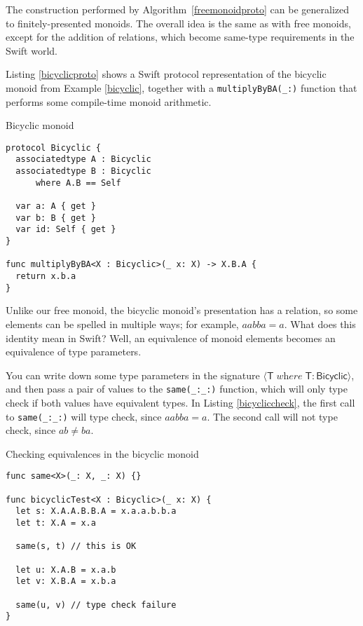 \documentclass[headsepline,bibliography=totoc]{scrreport}
\newcommand{\genericparam}[1]{\bm{\mathsf{#1}}}
\newcommand{\proto}[1]{\bm{\mathsf{#1}}}
\newcommand{\gensig}[2]{\langle #1\;\textit{where}\;#2\rangle}
\theoremstyle{definition}
\theoremstyle{definition}
\theoremstyle{definition}
\begin{document}
The construction performed by Algorithm~\ref{freemonoidproto} can be generalized to finitely-presented monoids. The overall idea is the same as with free monoids, except for the addition of relations, which become same-type requirements in the Swift world.

Listing \ref{bicyclicproto} shows a Swift protocol representation of the bicyclic monoid from Example \ref{bicyclic}, together with a \texttt{multiplyByBA(\_:)} function that performs some compile-time monoid arithmetic.

\begin{listing}\caption{Bicyclic monoid}\label{bicyclicproto}
\begin{Verbatim}
protocol Bicyclic {
  associatedtype A : Bicyclic
  associatedtype B : Bicyclic
      where A.B == Self
  
  var a: A { get }
  var b: B { get }
  var id: Self { get }
}

func multiplyByBA<X : Bicyclic>(_ x: X) -> X.B.A {
  return x.b.a
}
\end{Verbatim}
\end{listing}
Unlike our free monoid, the bicyclic monoid's presentation has a relation, so some elements can be spelled in multiple ways; for example, $aabba=a$. What does this identity mean in Swift? Well, an equivalence of monoid elements becomes an equivalence of type parameters.

You can write down some type parameters in the signature $\gensig{\genericparam{T}}{\genericparam{T}\colon\proto{Bicyclic}}$, and then pass a pair of values to the \texttt{same(\_:\_:)} function, which will only type check if both values have equivalent types. In Listing \ref{bicycliccheck}, the first call to \texttt{same(\_:\_:)} will type check, since $aabba=a$. The second call will not type check, since $ab\ne ba$.
\begin{listing}\caption{Checking equivalences in the bicyclic monoid}\label{bicycliccheck}
\begin{Verbatim}
func same<X>(_: X, _: X) {}

func bicyclicTest<X : Bicyclic>(_ x: X) {
  let s: X.A.A.B.B.A = x.a.a.b.b.a
  let t: X.A = x.a
  
  same(s, t) // this is OK
  
  let u: X.A.B = x.a.b
  let v: X.B.A = x.b.a
  
  same(u, v) // type check failure
}
\end{Verbatim}
\end{listing}
\end{document}
